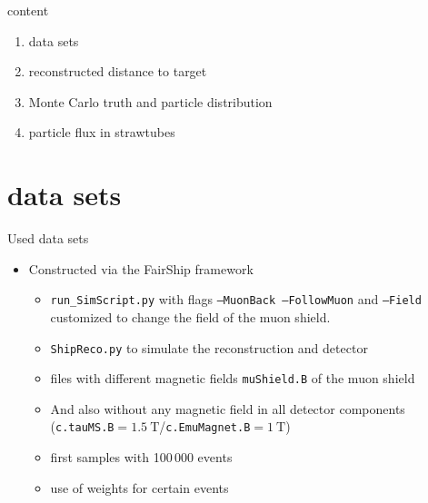



\maketitle


\begin{frame}[t]{content}
  \begin{enumerate} \setlength\itemsep{0.5cm}
    \item {\Large data sets}
    \item {\Large reconstructed distance to target}
    \item {\Large Monte Carlo truth and particle distribution}
    \item {\Large particle flux in strawtubes}
  \end{enumerate}
\end{frame}

\section{data sets}
\begin{frame}[t]{Used data sets}
  \begin{itemize}
    \item Constructed via the FairShip framework
    \begin{itemize}
      \item \texttt{run\_SimScript.py} with flags \texttt{--MuonBack --FollowMuon} and \texttt{--Field} customized to change the field of the muon shield.
      \item \texttt{ShipReco.py} to simulate the reconstruction and detector
      \item files with different magnetic fields \texttt{muShield.B} of the muon shield
      \item And also without any magnetic field in all detector components (\texttt{c.tauMS.B}$=\SI{1.5}{\tesla}$/\texttt{c.EmuMagnet.B}$=\SI{1}{\tesla}$)
      \item first samples with 100\,000 events
      \item use of weights for certain events
    \end{itemize}
  \end{itemize}
\end{frame}

